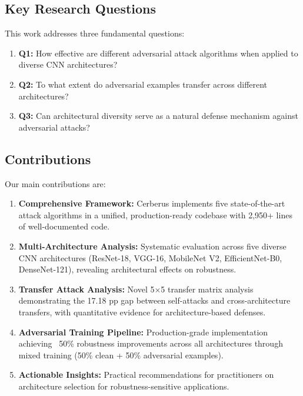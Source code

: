 \documentclass[10pt,conference]{IEEEtran}
\begin{document}
\subsection{Key Research Questions}

This work addresses three fundamental questions:

\begin{enumerate}
    \item \textbf{Q1:} How effective are different adversarial attack algorithms when applied to diverse CNN architectures?
    \item \textbf{Q2:} To what extent do adversarial examples transfer across different architectures?
    \item \textbf{Q3:} Can architectural diversity serve as a natural defense mechanism against adversarial attacks?
\end{enumerate}

\subsection{Contributions}

Our main contributions are:

\begin{enumerate}
    \item \textbf{Comprehensive Framework:} Cerberus implements five state-of-the-art attack algorithms in a unified, production-ready codebase with 2,950+ lines of well-documented code.
    
    \item \textbf{Multi-Architecture Analysis:} Systematic evaluation across five diverse CNN architectures (ResNet-18, VGG-16, MobileNet V2, EfficientNet-B0, DenseNet-121), revealing architectural effects on robustness.
    
    \item \textbf{Transfer Attack Analysis:} Novel 5×5 transfer matrix analysis demonstrating the 17.18 pp gap between self-attacks and cross-architecture transfers, with quantitative evidence for architecture-based defenses.
    
    \item \textbf{Adversarial Training Pipeline:} Production-grade implementation achieving ~50\% robustness improvements across all architectures through mixed training (50\% clean + 50\% adversarial examples).
    
    \item \textbf{Actionable Insights:} Practical recommendations for practitioners on architecture selection for robustness-sensitive applications.
\end{enumerate}
\end{document}

